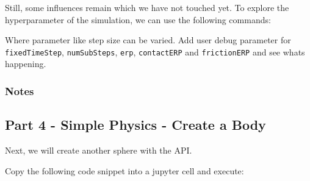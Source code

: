 Still, some influences remain which we have not touched yet. To explore
the hyperparameter of the simulation, we can use the following commands:

\begin{Shaded}
\begin{Highlighting}[]
\OperatorTok{*}

\OperatorTok{*}
\end{Highlighting}
\end{Shaded}

Where parameter like step size can be varied. Add user debug parameter
for \texttt{fixedTimeStep}, \texttt{numSubSteps}, \texttt{erp},
\texttt{contactERP} and \texttt{frictionERP} and see whats happening.

\hypertarget{notes-2}{%
\subsubsection{Notes}\label{notes-2}}

\pagebreak

\hypertarget{part-4---simple-physics---create-a-body}{%
\subsection{Part 4 - Simple Physics - Create a
Body}\label{part-4---simple-physics---create-a-body}}

Next, we will create another sphere with the API.

Copy the following code snippet into a jupyter cell and execute:

